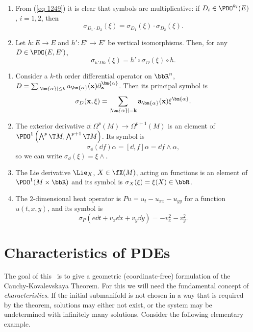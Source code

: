 \begin{rem}
    \begin{enumerate}
        \item From (\ref{eq 1249}) it is clear that symbols are multiplicative: if $D_i\in\PDO^{k_i}(E)$, $i=1,2$, then 
        \[\sigma_{D_1\cdot D_2}(\xi)=\sigma_{D_1}(\xi)\cdot \sigma_{D_2}(\xi).\]
        \item Let $h:E\to E$ and $h':E'\to E'$ be vertical isomorphisms. Then, for any $D\in\PDO(E,E')$, 
        \[\sigma_{h'Dh}(\xi)=h'\circ \sigma_D(\xi)\circ h.\]
    \end{enumerate}
\end{rem}


\begin{example}\label{ex symbols}
    \begin{enumerate}
        \item Consider a $k$-th order differential operator on $\bbR^n$, $D=\sum_{|\bm{\alpha}|\leq k}a_{\bm{\alpha}}(\bf{x})\partial^{\bm{\alpha}}_{\bf{x}}$. Then its principal symbol is 
        \[\sigma_D(\bf{x},\xi)=\sum_{|\bm{\alpha}|= k}a_{\bm{\alpha}}(\bf{x})\xi^{\bm{\alpha}}.\]
        \item The exterior derivative $\dd:\Omega^p(M)\to \Omega^{p+1}(M)$ is an element of $\PDO^1\left(\bigwedge^p \T M,\bigwedge^{p+1}\T M\right)$. Its symbol is 
        \[\sigma_{\dd}(\dd f)\alpha=[\dd,f]\alpha=\dd f\wedge\alpha,\] so we can write $\sigma_{\dd}(\xi)=\xi\wedge$.
        \item The Lie derivative $\Lie_X$, $X\in \fX(M)$, acting on functions is an element of $\PDO^1(M\times\bbR)$ and its symbol is $\sigma_X(\xi)=\xi(X)\in\bbR$.
        \item The $2$-dimensional heat operator is $Pu=u_t-u_{xx}-u_{yy}$ for a function $u(t,x,y)$, and its symbol is 
        \[\sigma_P(e\dd t+v_x\dd x+v_y\dd y)=-v_x^2-v_y^2.\]
    \end{enumerate}
\end{example}










\section{Characteristics of PDEs}


The goal of this \sect\ is to give a geometric (coordinate-free) formulation of the Cauchy-Kovalevskaya Theorem. For this we will need the fundamental concept of \emph{characteristics}. If the initial submanifold is not chosen in a way that is required by the theorem, solutions may either not exist, or the system may be undetermined with infinitely many solutions. Consider the following elementary example.

